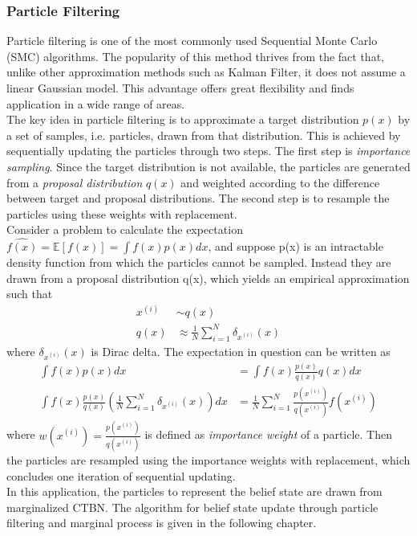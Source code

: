 \subsubsection{Particle Filtering}
Particle filtering is one of the most commonly used Sequential Monte Carlo (SMC) algorithms. The popularity of this method thrives from the fact that, unlike other approximation methods such as Kalman Filter, it does not assume a linear Gaussian model. This advantage offers great flexibility and finds application in a wide range of areas.\cite{Doucet2009} \\
The key idea in particle filtering is to approximate a target distribution $ p(x) $ by a set of samples, i.e. particles, drawn from that distribution. This is achieved by sequentially updating the particles through two steps. The first step is \textit{importance sampling}. Since the target distribution is not available, the particles are generated from a \textit{proposal distribution} $ q(x) $ and weighted according to the difference between target and proposal distributions. The second step is to resample the particles using these weights with replacement.\cite{Godsill2019} \\
Consider a problem to calculate the expectation $ \hat{f(x)} = \mathbb{E} \left[ f(x)\right] = \int f(x) p(x)dx $, and suppose p(x) is an intractable density function from which the particles cannot be sampled. Instead they are drawn from a proposal distribution q(x), which yields an empirical approximation such that
\begin{align*}
x^{(i)} & \sim q(x) \\
q(x) & \approx \frac{1}{N} \sum_{i=1}^{N} \delta_{x^{(i)}}(x)
\end{align*}
where $ \delta_{x^{(i)}}(x) $ is Dirac delta. The expectation in question can be written as
\begin{align*}
\int f(x) p(x)dx & = \int f(x) \frac{p(x)}{q(x)} q(x)dx\\
\int f(x) \frac{p(x)}{q(x)} \left( \frac{1}{N} \sum_{i=1}^{N} \delta_{x^{(i)}}(x)\right) dx & = \frac{1}{N} \sum_{i=1}^{N}\frac{p(x^{(i)})}{q(x^{(i)})} f(x^{(i)})
\end{align*}
where $ w(x^{(i)}) = \frac{p(x^{(i)})}{q(x^{(i)})} $ is defined as \textit{importance weight} of a particle. Then the particles are resampled using the importance weights with replacement, which concludes one iteration of sequential updating.\cite{Godsill2019}\\
In this application, the particles to represent the belief state are drawn from marginalized CTBN. The algorithm for belief state update through particle filtering and marginal process is given in the following chapter.

